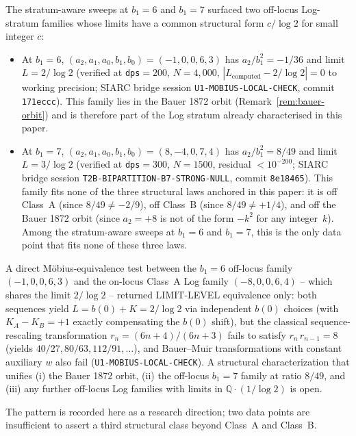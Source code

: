 \documentclass[11pt,a4paper]{article}
\theoremstyle{definition}
\begin{document}
The stratum-aware sweeps at $b_1 = 6$ and $b_1 = 7$ surfaced two off-locus Log-stratum families whose limits have a common structural form $c/\!\log 2$ for small integer $c$:

\begin{itemize}
  \item At $b_1 = 6$, $(a_2, a_1, a_0, b_1, b_0) = (-1, 0, 0, 6, 3)$ has $a_2/b_1^2 = -1/36$ and limit $L = 2/\!\log 2$ (verified at \texttt{dps}$=200$, $N = 4{,}000$, $|L_{\text{computed}} - 2/\!\log 2| = 0$ to working precision; SIARC bridge session \texttt{U1-MOBIUS-LOCAL-CHECK}, commit \texttt{171eccc}). This family lies in the Bauer 1872 orbit (Remark~\ref{rem:bauer-orbit}) and is therefore part of the Log stratum already characterised in this paper.

  \item At $b_1 = 7$, $(a_2, a_1, a_0, b_1, b_0) = (8, -4, 0, 7, 4)$ has $a_2/b_1^2 = 8/49$ and limit $L = 3/\!\log 2$ (verified at \texttt{dps}$=300$, $N = 1500$, residual $< 10^{-200}$; SIARC bridge session \texttt{T2B-BIPARTITION-B7-STRONG-NULL}, commit \texttt{8e18465}). This family fits none of the three structural laws anchored in this paper: it is off Class~A (since $8/49 \neq -2/9$), off Class~B (since $8/49 \neq +1/4$), and off the Bauer 1872 orbit (since $a_2 = +8$ is not of the form $-k^2$ for any integer~$k$). Among the stratum-aware sweeps at $b_1 = 6$ and $b_1 = 7$, this is the only data point that fits none of these three laws.
\end{itemize}

A direct M\"obius-equivalence test between the $b_1 = 6$ off-locus family $(-1,0,0,6,3)$ and the on-locus Class~A Log family $(-8,0,0,6,4)$ -- which shares the limit $2/\!\log 2$ -- returned LIMIT-LEVEL equivalence only: both sequences yield $L = b(0) + K = 2/\!\log 2$ via independent $b(0)$ choices (with $K_A - K_B = +1$ exactly compensating the $b(0)$ shift), but the classical sequence-rescaling transformation $r_n = (6n+4)/(6n+3)$ fails to satisfy $r_n\,r_{n-1} = 8$ (yields $40/27, 80/63, 112/91, \ldots$), and Bauer--Muir transformations with constant auxiliary $w$ also fail (\texttt{U1-MOBIUS-LOCAL-CHECK}). A structural characterization that unifies (i) the Bauer 1872 orbit, (ii) the off-locus $b_1 = 7$ family at ratio $8/49$, and (iii) any further off-locus Log families with limits in $\mathbb{Q}\cdot(1/\!\log 2)$ is open.

The pattern is recorded here as a research direction; two data points are insufficient to assert a third structural class beyond Class~A and Class~B.
\end{document}
